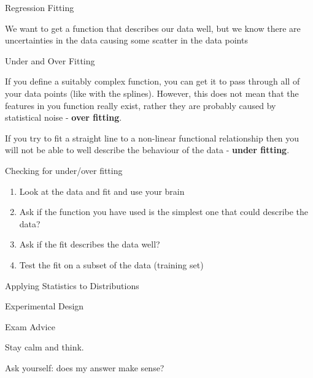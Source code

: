 \documentclass{beamer}
\begin{document}
\begin{frame}{Regression Fitting}

We want to get a function that describes our data well, but we know there are uncertainties in the data causing some scatter in the data points

\end{frame}


\begin{frame}{Under and Over Fitting}

If you define a suitably complex function, you can get it to pass through all of your data points (like with the splines).  However, this does not mean that the features in you function really exist, rather they are probably caused by statistical noise - \textbf{over fitting}.

\vspace{5mm}

If you try to fit a straight line to a non-linear functional relationship then you will not be able to well describe the behaviour of the data - \textbf{under fitting}.

\end{frame}


\begin{frame}{Checking for under/over fitting}

\begin{enumerate}
\item Look at the data and fit and use your brain
\item Ask if the function you have used is the simplest one that could describe the data?
\item Ask if the fit describes the data well?
\item Test the fit on a subset of the data (training set)
\end{enumerate}

\end{frame}


\begin{frame}{Applying Statistics to Distributions}

\end{frame}


\begin{frame}{Experimental Design}

\end{frame}




\begin{frame}{Exam Advice}

Stay calm and think.

\vspace{5mm}

Ask yourself: does my answer make sense?


\end{frame}
\end{document}
